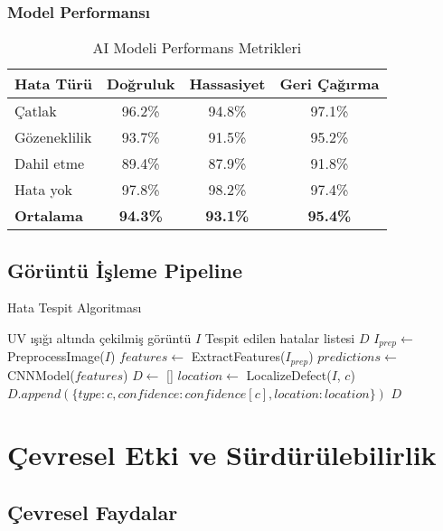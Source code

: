 \documentclass[12pt,a4paper]{article}
\begin{document}
\subsubsection{Model Performansı}
\begin{table}[H]
    \centering
    \caption{AI Modeli Performans Metrikleri}
    \begin{tabular}{lccc}
        \toprule
        \textbf{Hata Türü} & \textbf{Doğruluk} & \textbf{Hassasiyet} & \textbf{Geri Çağırma} \\
        \midrule
        Çatlak & 96.2\% & 94.8\% & 97.1\% \\
        Gözeneklilik & 93.7\% & 91.5\% & 95.2\% \\
        Dahil etme & 89.4\% & 87.9\% & 91.8\% \\
        Hata yok & 97.8\% & 98.2\% & 97.4\% \\
        \midrule
        \textbf{Ortalama} & \textbf{94.3\%} & \textbf{93.1\%} & \textbf{95.4\%} \\
        \bottomrule
    \end{tabular}
    \label{tab:ai_performance}
\end{table}

\subsection{Görüntü İşleme Pipeline}

\begin{algorithm}
\caption{Hata Tespit Algoritması}
\begin{algorithmic}[1]
\REQUIRE UV ışığı altında çekilmiş görüntü $I$
\ENSURE Tespit edilen hatalar listesi $D$
\STATE $I_{prep} \leftarrow$ PreprocessImage($I$)
\STATE $features \leftarrow$ ExtractFeatures($I_{prep}$)
\STATE $predictions \leftarrow$ CNNModel($features$)
\STATE $D \leftarrow$ []
        \STATE $location \leftarrow$ LocalizeDefect($I$, $c$)
        \STATE $D.append(\{type: c, confidence: confidence[c], location: location\})$
    \ENDIF
\ENDFOR
\RETURN $D$
\end{algorithmic}
\end{algorithm}

\section{Çevresel Etki ve Sürdürülebilirlik}

\subsection{Çevresel Faydalar}
\end{document}
